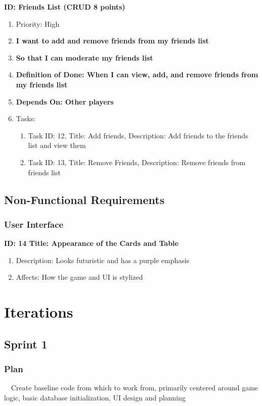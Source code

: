 \documentclass[12pt]{article}
\begin{document}
\textbf{ID: Friends List (CRUD 8 points)}
\begin{enumerate}
    \item Priority: High
    \item \textbf{I want to add and remove friends from my friends list}
    \item \textbf{So that I can moderate my friends list}
    \item \textbf{Definition of Done: When I can view, add, and remove friends from my friends list}
    \item \textbf{Depends On: Other players}
    \item Tasks:
    \begin{enumerate}
        \item Task ID: 12, Title: Add friends, Description: Add friends to the friends list and view them
        \item Task ID: 13, Title: Remove Friends, Description: Remove friends from friends list 
    \end{enumerate}
\end{enumerate}
\subsection{Non-Functional Requirements}
\subsubsection{User Interface}
\textbf{ID: 14 Title: Appearance of the Cards and Table}
\begin{enumerate}
    \item Description: Looks futuristic and has a purple emphasis
    \item Affects:  How the game and UI is stylized
\end{enumerate}

\section{Iterations}
\subsection{Sprint 1}
\subsubsection{Plan}
\ \ Create baseline code from which to work from, primarily centered around game logic, basic database initialization, UI design and planning
\end{document}
